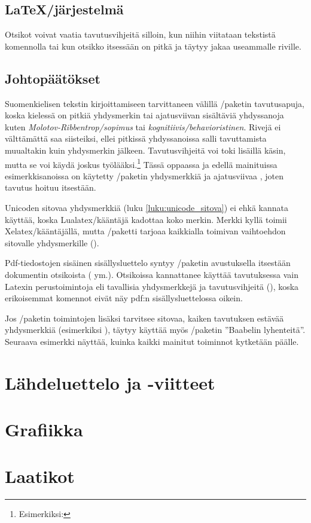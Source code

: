 \begin{koodilohkosis}
  \section[Latex-jär\-jes\-tel\-mä]{\LaTeX\-/järjestelmä}
\end{koodilohkosis}

Otsikot voivat vaatia tavutusvihjeitä silloin, kun niihin viitataan
tekstistä komennolla  tai kun otsikko itsessään on
pitkä ja täytyy jakaa useammalle riville.

\subsection{Johtopäätökset}

Suomenkielisen tekstin kirjoittamiseen tarvittaneen välillä
\-/paketin tavutus\-apuja, koska kielessä on pitkiä
yhdysmerkin tai ajatusviivan sisältäviä yhdyssanoja kuten
\emph{Molotov\--Ribben\-trop\-/sopimus} tai
\emph{kognitiivis\-/behavioristinen}. Rivejä ei välttämättä saa
siisteiksi, ellei pitkissä yhdyssanoissa salli tavuttamista muualtakin
kuin yhdysmerkin jälkeen. Tavutusvihjeitä voi toki lisäillä käsin, mutta
se voi käydä joskus työlääksi.\footnote{Esimerkiksi:
  } Tässä oppaassa ja
edellä mainituissa esimerkkisanoissa on käytetty
\-/paketin yhdysmerkkiä \koodi{\keno -/} ja
ajatusviivaa \koodi{\keno --}, joten tavutus hoituu itsestään.

Unicoden sitovaa yhdysmerkkiä (luku \ref{luku:unicode_sitova}) ei ehkä
kannata käyttää, koska Lualatex\-/kääntäjä kadottaa koko merkin. Merkki
kyllä toimii Xelatex\-/kääntäjällä, mutta \-/paketti
tarjoaa kaikkialla toimivan vaihtoehdon sitovalle yhdysmerkille
(\koodi{\keno =/}).

Pdf-tiedostojen sisäinen sisällysluettelo syntyy
\-/paketin avustuksella itsestään dokumentin
otsikoista ( ym.). Otsikoissa kannattanee käyttää
tavutuksessa vain Latexin perustoimintoja eli tavallisia yhdysmerkkejä
ja tavutusvihjeitä (\koodi{\keno-}), koska erikoisemmat komennot eivät
näy pdf:n sisällysluettelossa oikein.

Jos \-/paketin toimintojen lisäksi tarvitsee sitovaa,
kaiken tavutuksen estävää yhdysmerkkiä (esimerkiksi
), täytyy käyttää myös
\-/paketin ''Baabelin lyhenteitä''. Seuraava
esimerkki näyttää, kuinka kaikki mainitut toiminnot kytketään päälle.

\begin{koodilohkosis}
  \usepackage{polyglossia}
  \usepackage[shortcuts]{extdash}
  \setdefaultlanguage[babelshorthands]{finnish}
\end{koodilohkosis}

\section{Lähdeluettelo ja -viitteet}
\section{Grafiikka}
\section{Laatikot}
